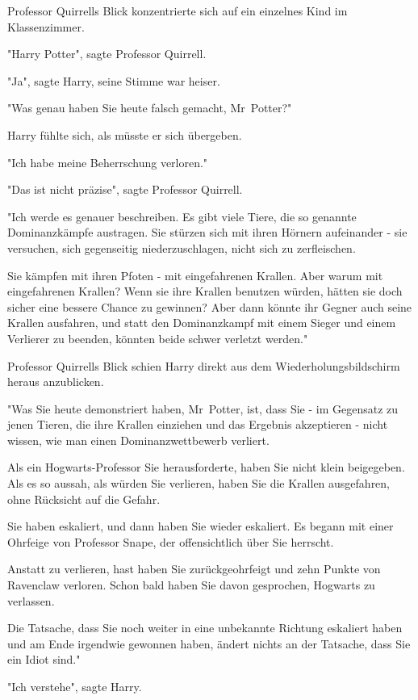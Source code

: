 {Professor Quirrells Blick konzentrierte sich auf ein einzelnes Kind im Klassenzimmer.

"Harry Potter", sagte Professor Quirrell.

"Ja", sagte Harry, seine Stimme war heiser.

"Was genau haben Sie heute falsch gemacht, Mr~Potter?"

Harry fühlte sich, als müsste er sich übergeben.

"Ich habe meine Beherrschung verloren."

"Das ist nicht präzise", sagte Professor Quirrell.

"Ich werde es genauer beschreiben. Es gibt viele Tiere, die so genannte Dominanzkämpfe austragen. Sie stürzen sich mit ihren Hörnern aufeinander - sie versuchen, sich gegenseitig niederzuschlagen, nicht sich zu zerfleischen.

Sie kämpfen mit ihren Pfoten - mit eingefahrenen Krallen. Aber warum mit eingefahrenen Krallen? Wenn sie ihre Krallen benutzen würden, hätten sie doch sicher eine bessere Chance zu gewinnen? Aber dann könnte ihr Gegner auch seine Krallen ausfahren, und statt den Dominanzkampf mit einem Sieger und einem Verlierer zu beenden, könnten beide schwer verletzt werden."

Professor Quirrells Blick schien Harry direkt aus dem Wiederholungsbildschirm heraus anzublicken.

"Was Sie heute demonstriert haben, Mr~Potter, ist, dass Sie - im Gegensatz zu jenen Tieren, die ihre Krallen einziehen und das Ergebnis akzeptieren - nicht wissen, wie man einen Dominanzwettbewerb verliert.

Als ein Hogwarts-Professor Sie herausforderte, haben Sie nicht klein beigegeben. Als es so aussah, als würden Sie verlieren, haben Sie die Krallen ausgefahren, ohne Rücksicht auf die Gefahr.

Sie haben eskaliert, und dann haben Sie wieder eskaliert. Es begann mit einer Ohrfeige von Professor Snape, der offensichtlich über Sie herrscht.

Anstatt zu verlieren, hast haben Sie zurückgeohrfeigt und zehn Punkte von Ravenclaw verloren. Schon bald haben Sie davon gesprochen, Hogwarts zu verlassen.

Die Tatsache, dass Sie noch weiter in eine unbekannte Richtung eskaliert haben und am Ende irgendwie gewonnen haben, ändert nichts an der Tatsache, dass Sie ein Idiot sind."

"Ich verstehe", sagte Harry.

}
